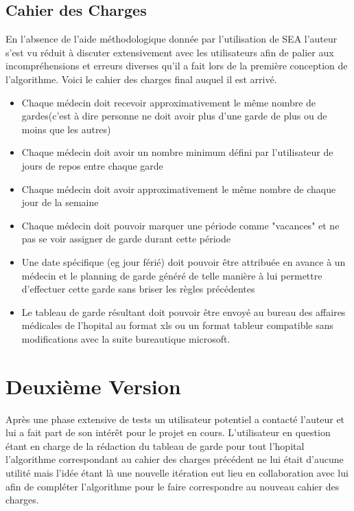 \documentclass[11pt]{report}
\begin{document}
\subsection{Cahier des Charges}
En l'absence de l'aide méthodologique donnée par l'utilisation de SEA l'auteur s'est vu réduit à discuter extensivement avec les utilisateurs afin de palier aux incompréhensions et erreurs diverses qu'il a fait lors de la première conception de l'algorithme.
Voici le cahier des charges final auquel il est arrivé.
\begin{itemize}
\item Chaque médecin doit recevoir approximativement le même nombre de gardes(c'est à dire personne ne doit avoir plus d'une garde de plus ou de moins que les autres)
\item Chaque médecin doit avoir un nombre minimum défini par l'utilisateur de jours de repos entre chaque garde
\item Chaque médecin doit avoir approximativement le même nombre de chaque jour de la semaine
\item Chaque médecin doit pouvoir marquer une période comme "vacances" et ne pas se voir assigner de garde durant cette période
\item Une date spécifique (eg jour férié) doit pouvoir être attribuée en avance à un médecin et le planning de garde généré de telle manière à lui permettre d'effectuer cette garde sans briser les règles précédentes
\item Le tableau de garde résultant doit pouvoir être envoyé au bureau des affaires médicales de l'hopital au format xls ou un format tableur compatible sans modifications avec la suite bureautique microsoft.
\end{itemize}

\section{Deuxième Version}
Après une phase extensive de tests un utilisateur potentiel a contacté l'auteur et lui a fait part de son intérêt pour le projet en cours.
L'utilisateur en question étant en charge de la rédaction du tableau de garde pour tout l'hopital l'algorithme correspondant au cahier des charges précédent ne lui était d'aucune utilité mais l'idée étant là une nouvelle itération eut lieu en collaboration avec lui afin de compléter l'algorithme pour le faire correspondre au nouveau cahier des charges.
\end{document}
